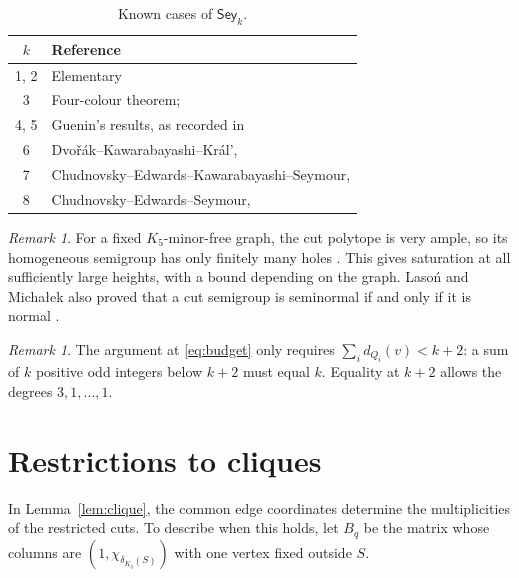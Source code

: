 \documentclass[10pt]{article}
\theoremstyle{definition}
\theoremstyle{remark}
\newtheorem{remark}[theorem]{Remark}
\begin{document}
\begin{table}[ht]
\centering
\caption{Known cases of $\mathsf{Sey}_k$.}\label{tab:cases}
\begin{tabular}{@{}cl@{}}
\toprule
$k$ & Reference\\
\midrule
1, 2 & Elementary\\
3 & Four-colour theorem; \cite[Section~1]{CES}\\
4, 5 & Guenin's results, as recorded in \cite[Section~1]{CES}\\
6 & Dvo\v r\'ak--Kawarabayashi--Kr\'al', \cite[Theorem~2]{DKK}\\
7 & Chudnovsky--Edwards--Kawarabayashi--Seymour, \cite[Theorem~1.2]{CEKS}\\
8 & Chudnovsky--Edwards--Seymour, \cite[Theorem~1.2]{CES}\\
\bottomrule
\end{tabular}
\end{table}

\begin{remark}
For a fixed $K_5$-minor-free graph, the cut polytope is very ample, so its homogeneous semigroup has only finitely many holes \cite[Theorem~2]{LM}.
This gives saturation at all sufficiently large heights, with a bound depending on the graph.
Laso\'n and Micha\l{}ek also proved that a cut semigroup is seminormal if and only if it is normal \cite[Theorem~3]{LM}.
\end{remark}

\begin{remark}
The argument at \eqref{eq:budget} only requires $\sum_i d_{Q_i}(v)<k+2$: a sum of $k$ positive odd integers below $k+2$ must equal $k$.
Equality at $k+2$ allows the degrees $3,1,\ldots,1$.
\end{remark}

\section{Restrictions to cliques}\label{sec:boundary}
In Lemma~\ref{lem:clique}, the common edge coordinates determine the multiplicities of the restricted cuts.
To describe when this holds, let $B_q$ be the matrix whose columns are $(1,\chi_{\delta_{K_q}(S)})$ with one vertex fixed outside $S$.
\end{document}
